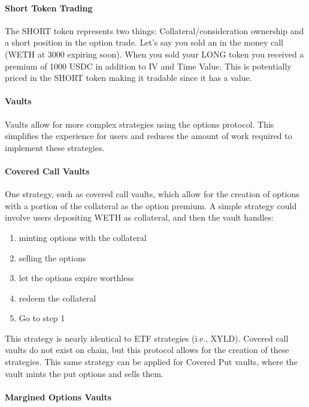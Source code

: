 \paragraph*{Short Token Trading}

The SHORT token represents two things:
Collateral/consideration ownership and a short position in the option
trade. Let's say you sold an in the money call (WETH at 3000 expiring
soon). When you sold your LONG token you received a premium of 1000 USDC
in addition to IV and Time Value. This is potentially priced in the
SHORT token making it tradable since it has a value.

\paragraph*{Vaults}

Vaults allow for more complex strategies using the options protocol.
This simplifies the experience for users and reduces the amount of work
required to implement these strategies.

\paragraph*{Covered Call Vaults}

One strategy, such as covered call vaults, which allow for the creation
of options with a portion of the collateral as the option premium. A
simple strategy could involve users depositing WETH as collateral, and
then the vault handles:
\begin{enumerate}
\item minting options with the collateral
\item selling the options
\item let the options expire worthless
\item redeem the collateral
\item Go to step 1
\end{enumerate}

This strategy is nearly identical to ETF strategies (i.e., XYLD). Covered
call vaults do not exist on chain, but this protocol allows for the
creation of these strategies. This same strategy can be applied for
Covered Put vaults, where the vault mints the put options and sells
them.

\paragraph*{Margined Options Vaults}

